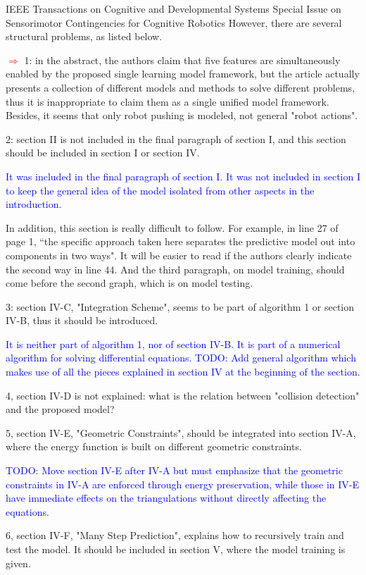 \documentclass[a4paper,12pt]{letter}
\newcommand{\comment}[1]{\textcolor{blue}{#1}}
\newcommand{\marker}{\hspace*{-1.6em}\textcolor{red}{$\Longrightarrow$}}
\begin{document}
\begin{letter}{IEEE Transactions on Cognitive and Developmental Systems\newline
Special Issue on Sensorimotor Contingencies for Cognitive Robotics}
However, there are several structural problems, as listed below. 

\marker
1: in the abstract, the authors claim that five features are simultaneously enabled by the proposed single learning model framework, but the article actually presents a collection of different models and methods to solve different problems, thus it is inappropriate to claim them as a single unified model framework. Besides, it seems that only robot pushing is modeled, not general "robot actions". 

2: section II is not included in the final paragraph of section I, and this section should be included in section I or section IV.

\comment{It was included in the final paragraph of section I.  It was not included in section I to keep the general idea of the model isolated from other aspects in the introduction.}

In addition, this section is really difficult to follow. For example, in line 27 of page 1, “the specific approach taken here separates the predictive model out into components in two ways". It will be easier to read if the authors clearly indicate the second way in line 44. And the third paragraph, on model training, should come before the second graph, which is on model testing. 

3: section IV-C, "Integration Scheme", seems to be part of algorithm 1 or section IV-B, thus it should be introduced.

\comment{It is neither part of algorithm 1, nor of section IV-B.  It is part of a numerical algorithm for solving differential equations. \newline TODO: Add general algorithm which makes use of all the pieces explained in section IV at the beginning of the section.}

4, section IV-D is not explained: what is the relation between "collision detection" and the proposed model? 

5, section IV-E, "Geometric Constraints", should be integrated into section IV-A, where the energy function is built on different geometric constraints.

\comment{TODO: Move section IV-E after IV-A but must emphasize that the geometric constraints in IV-A are enforced through energy preservation, while those in IV-E have immediate effects on the triangulations without directly affecting the equations.}

6, section IV-F, "Many Step Prediction", explains how to recursively train and test the model. It should be included in section V, where the model training is given.


\end{letter}
\end{document}
